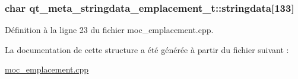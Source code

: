 \hypertarget{structqt__meta__stringdata__emplacement__t_af14932ea4cfac05db872ab1e88cc304b}{
\subsubsection[{stringdata}]{\setlength{\rightskip}{0pt plus 5cm}char qt\-\_\-meta\-\_\-stringdata\-\_\-emplacement\-\_\-t\-::stringdata\mbox{[}133\mbox{]}}}\label{structqt__meta__stringdata__emplacement__t_af14932ea4cfac05db872ab1e88cc304b}


Définition à la ligne 23 du fichier moc\-\_\-emplacement.\-cpp.



La documentation de cette structure a été générée à partir du fichier suivant \-:\begin{DoxyCompactItemize}
\item 
\hyperlink{moc__emplacement_8cpp}{moc\-\_\-emplacement.\-cpp}\end{DoxyCompactItemize}
